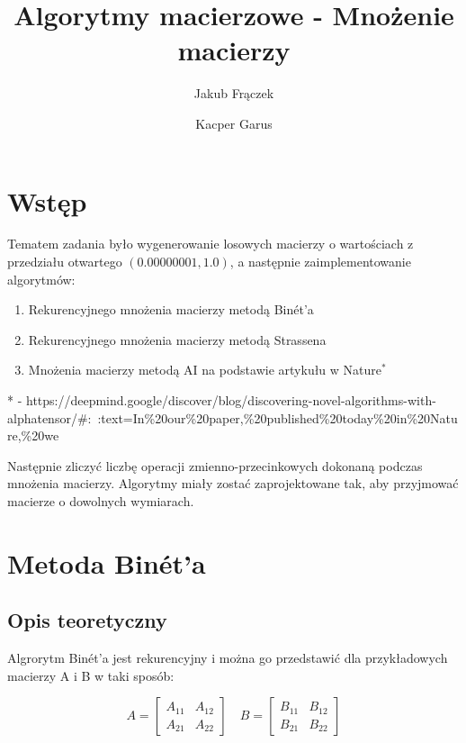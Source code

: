 \documentclass{article}
\title{Algorytmy macierzowe - Mnożenie macierzy}
\author{Jakub Frączek \and Kacper Garus}
\begin{document}
\sloppy

\maketitle

\tableofcontents

\newpage

\section{Wstęp}

Tematem zadania było wygenerowanie losowych macierzy o wartościach z przedziału otwartego \((0.00000001, 1.0)\), a następnie zaimplementowanie algorytmów:

\begin{enumerate}
    \item Rekurencyjnego mnożenia macierzy metodą Binét’a
    \item Rekurencyjnego mnożenia macierzy metodą Strassena
    \item Mnożenia macierzy metodą AI na podstawie artykułu w Nature\(^*\)
\end{enumerate}

\noindent
* - https://deepmind.google/discover/blog/discovering-novel-algorithms-with-alphatensor/\#:~:text=In\%20our\%20paper,\%20published\%20today\%20in\%20Nature,\%20we

\bigbreak
\noindent
Następnie zliczyć liczbę operacji zmienno-przecinkowych dokonaną podczas mnożenia macierzy. Algorytmy miały zostać zaprojektowane tak, aby przyjmować macierze o dowolnych wymiarach.

\section{Metoda Binét’a}

\subsection{Opis teoretyczny}

Algrorytm Binét'a jest rekurencyjny i można go przedstawić dla przykładowych macierzy A i B w taki sposób:

\[
A =
\begin{bmatrix}
A_{11} & A_{12} \\
A_{21} & A_{22}
\end{bmatrix}
\quad
B =
\begin{bmatrix}
B_{11} & B_{12} \\
B_{21} & B_{22}
\end{bmatrix}
\]
\end{document}
